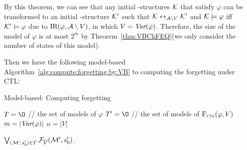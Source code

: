 \documentclass{article}
\begin{document}
By this theorem, we can see that any initial \MPK-structures ${\cal K}$ that satisfy $\varphi$ can be transformed to an initial \MPK-structure ${\cal K}'$ such that ${\cal K} \leftrightarrow_{{\cal A} \setminus V} {\cal K}'$ and ${\cal K} \models \varphi$ iff ${\cal K}' \models \varphi$ due to $\textrm{IR}(\varphi, {\cal A}\setminus V)$, in which $V= \textit{Var}(\varphi)$. Therefore, the size of the model of $\varphi$ is at most $2^m$ by Theorem~\ref{thm:VBChFEQ}(we only consider the number of states of this model).

Then we have the following model-based Algorithm~\ref{alg:compute:forgetting:by:VB} to computing the forgetting under CTL:


\begin{algorithm}[[tb]
\caption{Model-based: Computing forgetting}
\label{alg:compute:forgetting:by:VB}
$T={\O}$ // the set of models of $\varphi$ \;
$T' = {\O}$ // the set of models of ${\textsc{F}_{\textsc{ctl}}}(\varphi, V)$ \;
$m=|\textit{Var}(\varphi)|$\;
$n=|V|$\;

%
\Return $\bigvee_{({\cal M}', s_0')\in T} {\cal F}_{\overline V}({\cal M}', s_0')$.
\end{algorithm}
\end{document}
